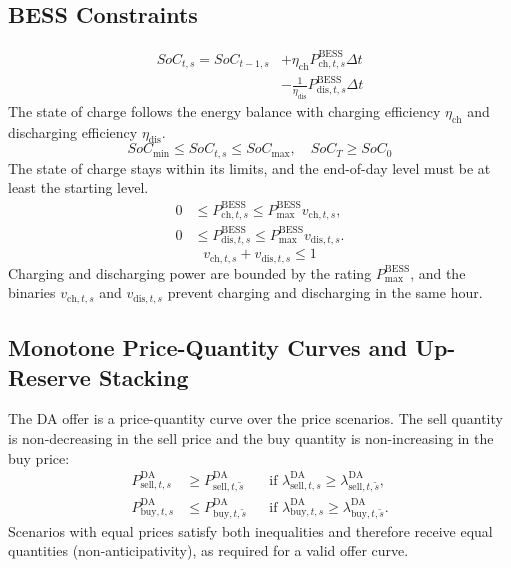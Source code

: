 \documentclass[5p,times,twocolumn]{elsarticle}
\begin{document}


\subsection{BESS Constraints}
\begin{equation}
\begin{split}
SoC_{t,s} = SoC_{t-1,s} &+ \eta_{\text{ch}} P_{\text{ch},t,s}^{\text{BESS}} \Delta t \\
& - \tfrac{1}{\eta_{\text{dis}}} P_{\text{dis},t,s}^{\text{BESS}} \Delta t
\end{split}
\label{eq:soc}
\end{equation}
The state of charge follows the energy balance with charging efficiency
$\eta_{\text{ch}}$ and discharging efficiency $\eta_{\text{dis}}$.
\begin{equation}
SoC_{\text{min}} \le SoC_{t,s} \le SoC_{\text{max}}, \quad SoC_T \ge SoC_0
\label{eq:soc_bounds}
\end{equation}
The state of charge stays within its limits, and the end-of-day level must be at
least the starting level.
\begin{equation}
\begin{aligned}
0 &\leq P_{\text{ch},t,s}^{\text{BESS}}
\leq P_{\max}^{\text{BESS}}v_{\text{ch},t,s},\\
0 &\leq P_{\text{dis},t,s}^{\text{BESS}}
\leq P_{\max}^{\text{BESS}}v_{\text{dis},t,s}.
\end{aligned}
\label{eq:bess_power}
\end{equation}
\begin{equation}
v_{\text{ch},t,s} + v_{\text{dis},t,s} \le 1
\label{eq:bess_excl}
\end{equation}
Charging and discharging power are bounded by the rating $P_{\max}^{\text{BESS}}$,
and the binaries $v_{\text{ch},t,s}$ and $v_{\text{dis},t,s}$ prevent charging
and discharging in the same hour.

\subsection{Monotone Price-Quantity Curves and Up-Reserve Stacking}
The DA offer is a price-quantity curve over the price scenarios. The sell
quantity is non-decreasing in the sell price and the buy quantity is
non-increasing in the buy price:
\begin{align}
P_{\text{sell},t,s}^{\text{DA}} &\ge P_{\text{sell},t,\tilde{s}}^{\text{DA}}
 && \text{if } \lambda_{\text{sell},t,s}^{\text{DA}} \ge \lambda_{\text{sell},t,\tilde{s}}^{\text{DA}},\nonumber\\
P_{\text{buy},t,s}^{\text{DA}} &\le P_{\text{buy},t,\tilde{s}}^{\text{DA}}
 && \text{if } \lambda_{\text{buy},t,s}^{\text{DA}} \ge \lambda_{\text{buy},t,\tilde{s}}^{\text{DA}}.
\label{eq:curve}
\end{align}
Scenarios with equal prices satisfy both inequalities and therefore receive
equal quantities (non-anticipativity), as required for a valid offer curve.
\end{document}
